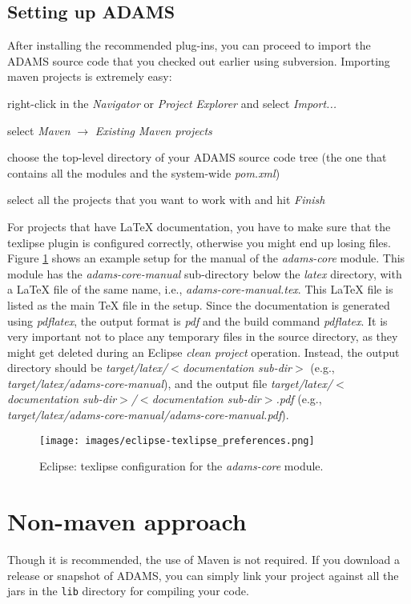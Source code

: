 \subsection{Setting up ADAMS}
After installing the recommended plug-ins, you can proceed to import the ADAMS
source code that you checked out earlier using subversion.
Importing maven projects is extremely easy:
\begin{tight_itemize}
  \item right-click in the \textit{Navigator} or \textit{Project Explorer} and
  select \textit{Import...}
  \item select \textit{Maven} $\rightarrow$ \textit{Existing Maven projects}
  \item choose the top-level directory of your ADAMS source code tree (the one
  that contains all the modules and the system-wide \textit{pom.xml})
  \item select all the projects that you want to work with and hit
  \textit{Finish}
\end{tight_itemize}
For projects that have LaTeX documentation, you have to make sure that the
texlipse plugin is configured correctly, otherwise you might end up losing
files. Figure \ref{eclipse-texlipse_preferences} shows an example setup for the
manual of the \textit{adams-core} module. This module has the
\textit{adams-core-manual} sub-directory below the \textit{latex} directory,
with a LaTeX file of the same name, i.e., \textit{adams-core-manual.tex}. This
LaTeX file is listed as the main TeX file in the setup. Since the documentation
is generated using \textit{pdflatex}, the output format is \textit{pdf} and the
build command \textit{pdflatex}. It is very important not to place any temporary
files in the source directory, as they might get deleted during an Eclipse
\textit{clean project} operation. Instead, the output directory should be
\textit{target/latex/$<$documentation sub-dir$>$} (e.g.,
\textit{target/latex/adams-core-manual}), and the output file
\textit{target/latex/$<$documentation sub-dir$>$/$<$documentation
sub-dir$>$.pdf} (e.g., \textit{target/latex/adams-core-manual/adams-core-manual.pdf}).

\begin{figure}[htb]
  \centering
  \texttt{[image: images/eclipse-texlipse\_preferences.png]}
  \caption{Eclipse: texlipse configuration for the \textit{adams-core} module.}
  \label{eclipse-texlipse_preferences}
\end{figure}

\section{Non-maven approach}
Though it is recommended, the use of Maven is not required. If you download
a release or snapshot of ADAMS, you can simply link your project against all
the jars in the \texttt{lib} directory for compiling your code.

